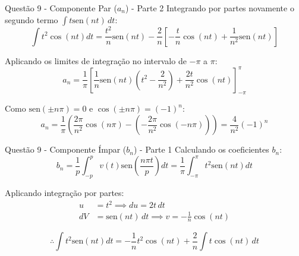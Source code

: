 \documentclass[8pt,aspectratio = 169]{beamer}
\begin{document}
\begin{frame}{Questão 9 - Componente Par ($a_n$) - Parte 2}
    Integrando por partes novamente o segundo termo $\int t \text{sen}(nt) \, dt$:
    \begin{equation*}
        \int t^2 \cos(nt) dt = \frac{t^2}{n} \text{sen}(nt) - \frac{2}{n} \left[ -\frac{t}{n} \cos(nt) + \frac{1}{n^2} \text{sen}(nt) \right]
    \end{equation*}
    
    Aplicando os limites de integração no intervalo de $-\pi$ a $\pi$:
    \begin{equation*}
        a_n = \frac{1}{\pi} \left[ \frac{1}{n} \text{sen}(nt) \left( t^2 - \frac{2}{n^2} \right) + \frac{2t}{n^2} \cos(nt) \right]_{-\pi}^{\pi}
    \end{equation*}
    
    Como $\text{sen}(\pm n\pi) = 0$ e $\cos(\pm n\pi) = (-1)^n$:
    \begin{equation*}
        a_n = \frac{1}{\pi} \left( \frac{2\pi}{n^2} \cos(n\pi) - \left(-\frac{2\pi}{n^2} \cos(-n\pi)\right) \right) = \frac{4}{n^2} (-1)^n
    \end{equation*}
\end{frame}

\begin{frame}{Questão 9 - Componente Ímpar ($b_n$) - Parte 1}
    Calculando os coeficientes $b_n$:
    \begin{equation*}
        b_n = \frac{1}{p} \int_{-p}^{p} v(t) \text{sen}\left(\frac{n\pi t}{p}\right) dt = \frac{1}{\pi} \int_{-\pi}^{\pi} t^2 \text{sen}(nt) dt
    \end{equation*}
    
    Aplicando integração por partes:
    \begin{align*}
        u &= t^2 \implies du = 2t \, dt \\
        dV &= \text{sen}(nt) \, dt \implies v = -\frac{1}{n} \cos(nt)
    \end{align*}
    
    \begin{equation*}
        \therefore \int t^2 \text{sen}(nt) dt = -\frac{1}{n} t^2 \cos(nt) + \frac{2}{n} \int t \cos(nt) \, dt
    \end{equation*}
\end{frame}
\end{document}
